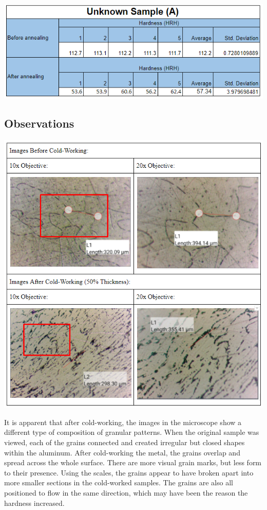 \documentclass{article}
\begin{document}
\begin{center}
\includegraphics[width=400pt]{Annealing.png}
\end{center}

\subsection{Observations}

\begin{center}
\includegraphics[width=400pt]{ColdWorking.png}
\end{center}

\indent It is apparent that after cold-working, the images in the microscope show a different type of composition of granular patterns. When the original sample was viewed, each of the grains connected and created irregular but closed shapes within the aluminum. After cold-working the metal, the grains overlap and spread across the whole surface. There are more visual grain marks, but less form to their presence. Using the scales, the grains appear to have broken apart into more smaller sections in the cold-worked samples. The grains are also all positioned to flow in the same direction, which may have been the reason the hardness increased. 
\end{document}

